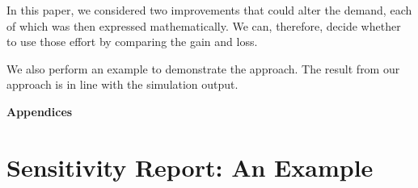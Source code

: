 \documentclass[a4paper,11pt]{article}
\begin{document}
In this paper, we considered two improvements that could alter the demand, each of which was then expressed mathematically. We can, therefore, decide whether to use those effort by comparing the gain and loss.

We also perform an example to demonstrate the approach. The result from our approach is in line with the simulation output.

\printbibliography
\newpage
\begin{center}
{\bf\Large Appendices}
\end{center}

\appendix

\section{Sensitivity Report: An Example}
\label{se:report}
\end{document}
